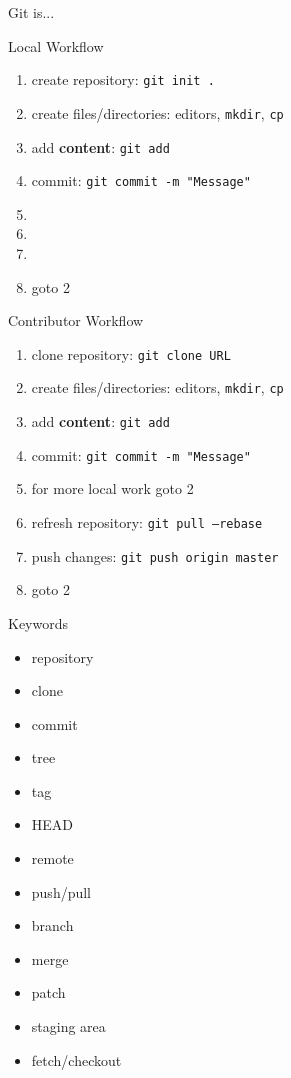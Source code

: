 \documentclass{beamer}
\begin{document}
\begin{frame}{Git is...}
  \begin{center}
  \end{center}
\end{frame}

\begin{frame}{Local Workflow}
  \begin{enumerate}
    \item create repository: \texttt{git init .}
    \item create files/directories: editors, \texttt{mkdir}, \texttt{cp}
    \item add \textbf{content}: \texttt{git add}
    \item commit: \texttt{git commit -m "Message"}
    \item
    \item
    \item
    \item goto 2
  \end{enumerate}
\end{frame}

\begin{frame}{Contributor Workflow}
  \begin{enumerate}
    \item clone repository: \texttt{git clone URL}
    \item create files/directories: editors, \texttt{mkdir}, \texttt{cp}
    \item add \textbf{content}: \texttt{git add}
    \item commit: \texttt{git commit -m "Message"}
    \item for more local work goto 2
    \item refresh repository: \texttt{git pull --rebase}
    \item push changes: \texttt{git push origin master}
    \item goto 2
  \end{enumerate}
\end{frame}

\begin{frame}{Keywords}
  \begin{itemize}
    \item repository
    \item clone
    \item commit
    \item tree
    \item tag
    \item HEAD
    \item remote
    \item push/pull
    \item branch
    \item merge
    \item patch
    \item staging area
    \item fetch/checkout
  \end{itemize}
\end{frame}
\end{document}
